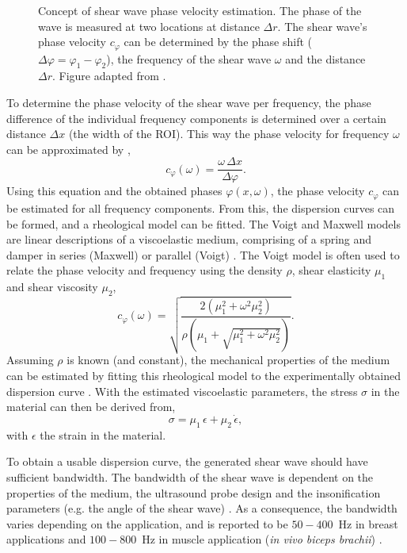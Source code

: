 \begin{figure}[t]
\begin{minipage}[t]{.48\textwidth}
    \caption{Concept of shear wave phase velocity estimation. The phase of the wave is measured at two locations at distance $\Delta r$. The shear wave's phase velocity $c_{\varphi}$ can be  determined by the phase shift ($\Delta \varphi = \varphi_1 - \varphi_2$), the frequency of the shear wave $\omega$ and the distance $\Delta r$. Figure adapted from \citet{chen_quantifying_2004}.}
    \label{fig:us_sws_phase_diff}
\end{minipage}
\end{figure}


To determine the phase velocity of the shear wave per frequency, the phase difference of the individual frequency components is determined over a certain distance $\Delta x$ (the width of the ROI). This way the phase velocity for frequency $\omega$ can be approximated by \cite{chen_quantifying_2004},
\begin{equation}
    c_{\varphi}(\omega) = \frac{\omega \, \Delta x}{\Delta \varphi}.
\end{equation}
Using this equation and the obtained phases $\varphi(x,\omega)$, the phase velocity $c_{\varphi}$ can be estimated for all frequency components. From this, the dispersion curves can be formed, and a rheological model can be fitted. The Voigt and Maxwell models are linear descriptions of a viscoelastic medium, comprising of a spring and damper in series (Maxwell) or parallel (Voigt) \cite{chen_quantifying_2004}. The Voigt model is often used to relate the phase velocity and frequency using the density $\rho$, shear elasticity $\mu_1$ and shear viscosity $\mu_2$,
\begin{equation}
    c_{\varphi}(\omega) = \sqrt{\frac{2\left( \mu_1^2+\omega^2 \mu_2^2\right)}{\rho \left( \mu_1 + \sqrt{\mu_1^2 + \omega^2 \mu_2^2} \right)}}.
\end{equation}
Assuming $\rho$ is known (and constant), the mechanical properties of the medium can be estimated by fitting this rheological model to the experimentally obtained dispersion curve \cite{deffieux_shear_2009}. With the estimated viscoelastic parameters, the stress $\sigma$ in the material can then be derived from,
\begin{equation}
	\sigma = \mu_1 \, \epsilon + \mu_2 \, \dot\epsilon,
\end{equation}
with $\epsilon$ the strain in the material. 

To obtain a usable dispersion curve, the generated shear wave should have sufficient bandwidth. The bandwidth of the shear wave is dependent on the properties of the medium, the ultrasound probe design and the insonification parameters (e.g. the angle of the shear wave) \cite{nguyen_assessment_2011}. As a consequence, the bandwidth varies depending on the application, and is reported to be $50-400$~\si{\hertz} in breast applications  \cite{nguyen_assessment_2011} and $100-800$~\si{\hertz} in muscle application (\textit{in vivo biceps brachii}) \cite{gennisson_viscoelastic_2010}.





